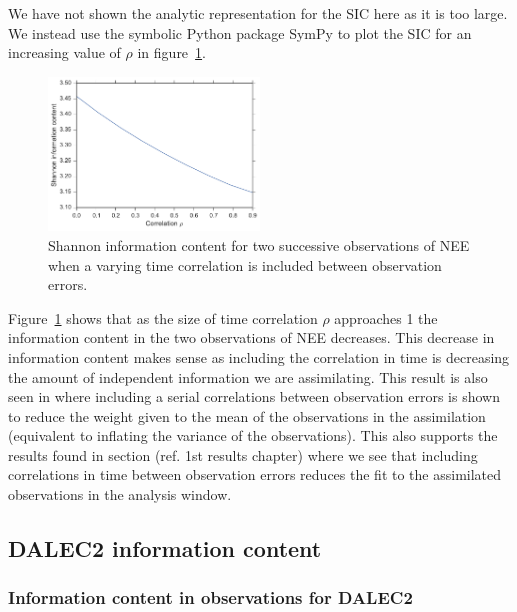 \documentclass[11pt]{article}
\begin{document}
We have not shown the analytic representation for the SIC here as it is too large. We instead use the symbolic Python package SymPy \citep{Joyner:2012:OSC:2110170.2110185} to plot the SIC for an increasing value of \(\rho\) in figure~\ref{fig:sic_corr_D1}.
\begin{figure}[ht]
	\centering
        \includegraphics[width=0.5\textwidth]{sic_corr_D1_nee.pdf}
    \caption{Shannon information content for two successive observations of NEE when a varying time correlation is included between observation errors.}
    \label{fig:sic_corr_D1}
\end{figure}
Figure~\ref{fig:sic_corr_D1} shows that as the size of time correlation \(\rho\) approaches 1 the information content in the two observations of NEE decreases. This decrease in information content makes sense as including the correlation in time is decreasing the amount of independent information we are assimilating. This result is also seen in \citet{jarvinen1999variational} where including a serial correlations between observation errors is shown to reduce the weight given to the mean of the observations in the assimilation (equivalent to inflating the variance of the observations). This also supports the results found in section ({\color{red}ref. 1st results chapter}) where we see that including correlations in time between observation errors reduces the fit to the assimilated observations in the analysis window.


\subsection{DALEC2 information content} \label{sec:D2_IC}%
\subsubsection{Information content in observations for DALEC2}
\end{document}
